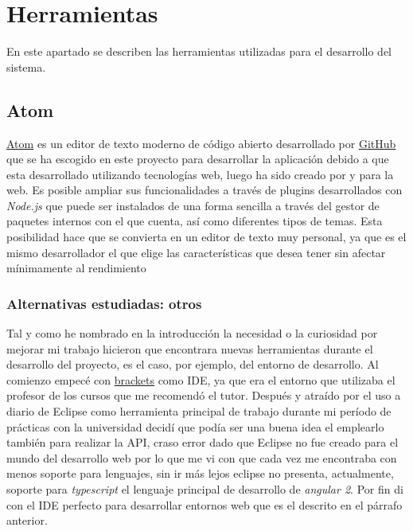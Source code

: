 

\section{Herramientas}\label{herramientas}
En este apartado se describen las herramientas utilizadas para el desarrollo del sistema.

\subsection{Atom}\label{entorno-desarrollo}
\hyperlink{https://atom.io/}{Atom} es un editor de texto moderno de código abierto desarrollado por  \hyperlink{http://brackets.io/}{GitHub}  que se ha escogido en este proyecto para desarrollar la aplicación debido a que esta desarrollado utilizando tecnologías web, luego ha sido creado por y para la web. Es posible ampliar sus funcionalidades a través de plugins desarrollados con \emph{Node.js} que puede ser instalados de una forma sencilla a través del gestor de paquetes internos con el que cuenta, así como diferentes tipos de temas. Esta posibilidad hace que se convierta en un editor de texto muy personal, ya que es el mismo desarrollador el que elige las características que desea tener sin afectar mínimamente al rendimiento


\subsubsection{Alternativas estudiadas: otros }\label{detalle IDE}
Tal y como he nombrado en la introducción la necesidad o la curiosidad por mejorar mi trabajo hicieron que encontrara nuevas herramientas durante el desarrollo del proyecto, es el caso, por ejemplo, del entorno de desarrollo. Al comienzo empecé con \hyperlink{http://brackets.io/}{brackets} como IDE, ya que era el entorno que utilizaba el profesor de los cursos que me recomendó el tutor. Después y atraído por el uso a diario de Eclipse como herramienta principal de trabajo durante mi período de prácticas con la universidad decidí que podía ser una buena idea el emplearlo también para realizar la API, craso error dado que Eclipse no fue creado para el mundo del desarrollo web por lo que me vi con que cada vez me encontraba con menos soporte para lenguajes, sin ir más lejos eclipse no presenta, actualmente, soporte para  \emph{typescript} el lenguaje principal de desarrollo de  \emph{angular 2}. Por fin di con el IDE perfecto para desarrollar entornos web que es el descrito en el párrafo anterior.

